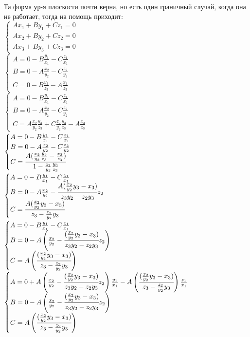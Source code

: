 \documentclass[12pt]{article} %
\begin{document}
    Та форма ур-я плоскости почти верна, но есть один граничный случай, когда она не работает, тогда на помощь приходит:\\$\begin{cases}
    Ax_1 + By_1 + Cz_1 = 0 \\ Ax_2 + By_2 + Cz_2 = 0 \\ Ax_3 + By_3 + Cz_3 = 0
    \end{cases}$\\$\begin{cases}
    A = 0 - B\frac{y_1}{x_1} - C\frac{z_1}{x_1} \\  B = 0 - A\frac{x_2}{y_2} - C\frac{z_2}{y_2}  \\ C = 0 - B\frac{y_3}{z_3} - A\frac{x_3}{z_3}
    \end{cases}$\\$\begin{cases}
    A = 0 - B\frac{y_1}{x_1} - C\frac{z_1}{x_1} \\  B = 0 - A\frac{x_2}{y_2} - C\frac{z_2}{y_2}  \\ C = A\frac{x_2}{y_2}\frac{y_3}{z_3} + C\frac{z_2}{y_2}\frac{y_3}{z_3} - A\frac{x_3}{z_3}
    \end{cases}$\\$\begin{cases}
    A = 0 - B\frac{y_1}{x_1} - C\frac{z_1}{x_1} \\  B = 0 - A\frac{x_2}{y_2} - C\frac{z_2}{y_2}  \\ C =\cfrac{ A(\frac{x_2}{y_2}\frac{y_3}{z_3} - \frac{x_3}{z_3})}{1 - \frac{z_2}{y_2}\frac{y_3}{z_3}}
    \end{cases}$\\$\begin{cases}
    A = 0 - B\frac{y_1}{x_1} - C\frac{z_1}{x_1} \\  B = 0 - A\frac{x_2}{y_2} - \cfrac{ A(\frac{x_2}{y_2}y_3 - x_3)}{z_3y_2 - z_2y_3}z_2  \\ C =\cfrac{ A(\frac{x_2}{y_2}y_3 - x_3)}{z_3 - \frac{z_2}{y_2}y_3}
    \end{cases}$\\$\begin{cases}
    A = 0 - B\frac{y_1}{x_1} - C\frac{z_1}{x_1} \\  B = 0 - A\left(\frac{x_2}{y_2} - \cfrac{ (\frac{x_2}{y_2}y_3 - x_3)}{z_3y_2 - z_2y_3}z_2\right)  \\ C =A\left(\cfrac{ (\frac{x_2}{y_2}y_3 - x_3)}{z_3 - \frac{z_2}{y_2}y_3}\right)
    \end{cases}$\\$\begin{cases}
    A = 0 + A\left(\frac{x_2}{y_2} - \cfrac{ (\frac{x_2}{y_2}y_3 - x_3)}{z_3y_2 - z_2y_3}z_2\right)\frac{y_1}{x_1} - A\left(\cfrac{ (\frac{x_2}{y_2}y_3 - x_3)}{z_3 - \frac{z_2}{y_2}y_3}\right)\frac{z_1}{x_1} \\  B = 0 - A\left(\frac{x_2}{y_2} - \cfrac{ (\frac{x_2}{y_2}y_3 - x_3)}{z_3y_2 - z_2y_3}z_2\right)  \\ C =A\left(\cfrac{ (\frac{x_2}{y_2}y_3 - x_3)}{z_3 - \frac{z_2}{y_2}y_3}\right)
    \end{cases}$
\end{document}
